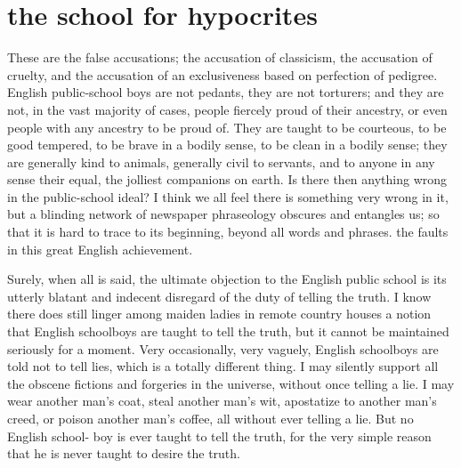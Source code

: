 \documentclass[final,10pt,letterpaper,twocolumn,openany]{book}
\begin{document}
\section{the school for hypocrites}

    These are the false accusations; the accusation of classicism, the
accusation of cruelty, and the accusation of an exclusiveness based on
perfection of pedigree. English public-school boys are not pedants, they
are not torturers; and they are not, in the vast majority of cases, people
fiercely proud of their ancestry, or even people with any ancestry to be
proud of. They are taught to be courteous, to be good tempered, to be
brave in a bodily sense, to be clean in a bodily sense; they are generally
kind to animals, generally civil to servants, and to anyone in any sense
their equal, the jolliest companions on earth. Is there then anything wrong
in the public-school ideal? I think we all feel there is something very
wrong in it, but a blinding network of newspaper phraseology obscures
and entangles us; so that it is hard to trace to its beginning, beyond all
words and phrases. the faults in this great English achievement.

Surely, when all is said, the ultimate objection to the English public
school is its utterly blatant and indecent disregard of the duty of telling the
truth. I know there does still linger among maiden ladies in remote country
houses a notion that English schoolboys are taught to tell the truth, but it
cannot be maintained seriously for a moment. Very occasionally, very
vaguely, English schoolboys are told not to tell lies, which is a totally
different thing. I may silently support all the obscene fictions and forgeries
in the universe, without once telling a lie. I may wear another man's coat,
steal another man's wit, apostatize to another man's creed, or poison
another man's coffee, all without ever telling a lie. But no English school-
boy is ever taught to tell the truth, for the very simple reason that he is
never taught to desire the truth. 
\end{document}
